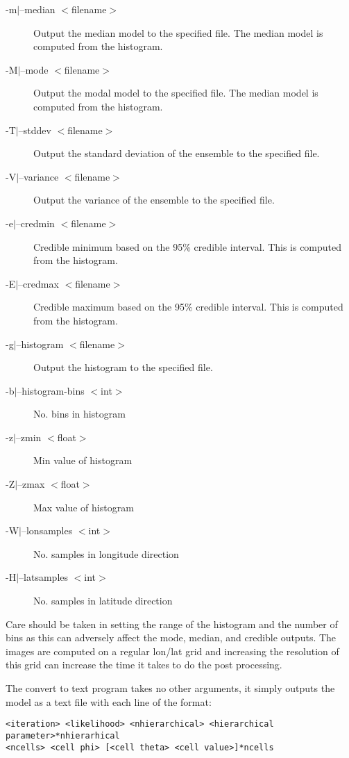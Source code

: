 \documentclass{article}
\begin{document}
\begin{description}
\item [-m$|$--median $<$filename$>$] Output the median model to the specified file. The median model is computed from the histogram.
\item [-M$|$--mode $<$filename$>$] Output the modal model to the specified file. The median model is computed from the histogram.
\item [-T$|$--stddev $<$filename$>$] Output the standard deviation of the ensemble to the specified file.
\item [-V$|$--variance $<$filename$>$] Output the variance of the ensemble to the specified file.
\item [-e$|$--credmin $<$filename$>$] Credible minimum based on the 95\% credible interval. This is computed from the histogram.
\item [-E$|$--credmax $<$filename$>$] Credible maximum based on the 95\% credible interval. This is computed from the histogram.
\item [-g$|$--histogram $<$filename$>$] Output the histogram to the specified file.

\item [-b$|$--histogram-bins $<$int$>$] No. bins in histogram
\item [-z$|$--zmin $<$float$>$] Min value of histogram
\item [-Z$|$--zmax $<$float$>$] Max value of histogram

\item [-W$|$--lonsamples $<$int$>$]       No. samples in longitude direction
\item [-H$|$--latsamples $<$int$>$]       No. samples in latitude direction
\end{description}

Care should be taken in setting the range of the histogram and the
number of bins as this can adversely affect the mode, median, and
credible outputs. The images are computed on a regular lon/lat grid
and increasing the resolution of this grid can increase the time it
takes to do the post processing.

The convert to text program takes no other arguments, it simply
outputs the model as a text file with each line of the format:

\begin{verbatim}
<iteration> <likelihood> <nhierarchical> <hierarchical parameter>*nhierarhical
<ncells> <cell phi> [<cell theta> <cell value>]*ncells
\end{verbatim}
\end{document}
